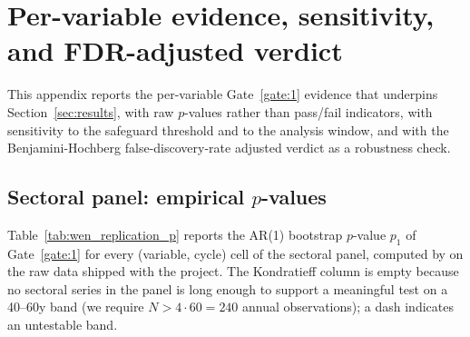 \section{Per-variable evidence, sensitivity, and FDR-adjusted verdict}
\label{app:per_variable}

This appendix reports the per-variable Gate~\ref{gate:1} evidence
that underpins Section~\ref{sec:results}, with raw \(p\)-values
rather than pass/fail indicators, with sensitivity to the
safeguard threshold and to the analysis window, and with the
Benjamini-Hochberg false-discovery-rate adjusted verdict as a
robustness check.

\subsection{Sectoral panel: empirical \(p\)-values}

Table~\ref{tab:wen_replication_p} reports the AR(1) bootstrap
\(p\)-value \(p_1\) of Gate~\ref{gate:1} for every (variable,
cycle) cell of the sectoral panel, computed by
 on the raw data shipped with
the project. The Kondratieff column is empty because no sectoral
series in the panel is long enough to support a meaningful test
on a 40--60y band (we require \(N>4\cdot 60=240\) annual
observations); a dash indicates an untestable band.

